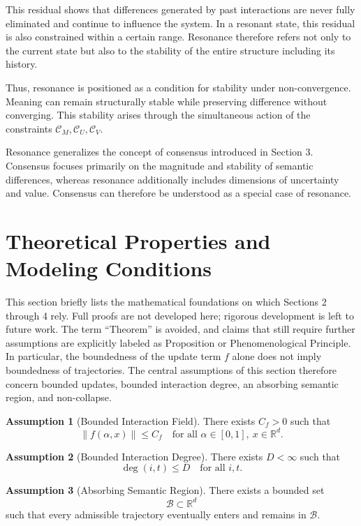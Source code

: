 \documentclass[11pt,a4paper]{article}
\theoremstyle{definition}
\newtheorem{assumption}{Assumption}[section]
\begin{document}
This residual shows that differences generated by past interactions are never fully eliminated and continue to influence the system. In a resonant state, this residual is also constrained within a certain range. Resonance therefore refers not only to the current state but also to the stability of the entire structure including its history.

Thus, resonance is positioned as a condition for stability under non-convergence. Meaning can remain structurally stable while preserving difference without converging. This stability arises through the simultaneous action of the constraints $\mathcal{C}_M, \mathcal{C}_U, \mathcal{C}_V$.

Resonance generalizes the concept of consensus introduced in Section 3. Consensus focuses primarily on the magnitude and stability of semantic differences, whereas resonance additionally includes dimensions of uncertainty and value. Consensus can therefore be understood as a special case of resonance.

\section{Theoretical Properties and Modeling Conditions}

This section briefly lists the mathematical foundations on which Sections 2 through 4 rely. Full proofs are not developed here; rigorous development is left to future work. The term ``Theorem'' is avoided, and claims that still require further assumptions are explicitly labeled as Proposition or Phenomenological Principle. In particular, the boundedness of the update term $f$ alone does not imply boundedness of trajectories. The central assumptions of this section therefore concern bounded updates, bounded interaction degree, an absorbing semantic region, and non-collapse.

\begin{assumption}[Bounded Interaction Field]
There exists $C_f>0$ such that
\[
\|f(\alpha,x)\| \le C_f
\quad
\text{for all } \alpha\in[0,1],\ x\in\mathbb{R}^d.
\]
\end{assumption}

\begin{assumption}[Bounded Interaction Degree]
There exists $D<\infty$ such that
\[
\deg(i,t) \le D
\quad
\text{for all } i,t.
\]
\end{assumption}

\begin{assumption}[Absorbing Semantic Region]
There exists a bounded set
\[
\mathcal{B}\subset\mathbb{R}^d
\]
such that every admissible trajectory eventually enters and remains in $\mathcal{B}$.
\end{assumption}
\end{document}

